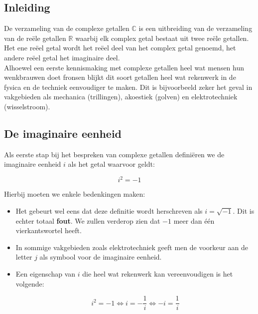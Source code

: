 
\subsection*{Inleiding}

De verzameling van de complexe getallen $\mathbb{C}$ is een uitbreiding van de verzameling van de re\"{e}le getallen $\mathbb{R}$ waarbij elk complex getal bestaat uit twee re\"{e}le getallen. Het ene re\"{e}el getal wordt het re\"{e}el deel van het complex getal genoemd, het andere re\"{e}el getal het imaginaire deel.\\ 
Alhoewel een eerste kennismaking met complexe getallen heel wat mensen hun wenkbrauwen doet fronsen blijkt dit soort getallen heel wat rekenwerk in de fysica en de techniek eenvoudiger te maken. Dit is bijvoorbeeld zeker het geval in vakgebieden als mechanica (trillingen), akoestiek (golven) en elektrotechniek (wisselstroom).\\

\subsection{De imaginaire eenheid}

Als eerste stap bij het bespreken van complexe getallen defini\"{e}ren we de imaginaire eenheid $i$ als het getal waarvoor geldt:

\begin{framed}
\[
i^2 =-1 
\]
\end{framed}

Hierbij moeten we enkele bedenkingen maken:\\
\begin{itemize}
\item Het gebeurt wel eens dat deze definitie wordt herschreven als $i=\sqrt{-1}$. Dit is echter totaal {\bf fout}. We zullen verderop zien dat $-1$ meer dan \'{e}\'{e}n vierkantswortel heeft.
\item In sommige vakgebieden zoals elektrotechniek geeft men de voorkeur aan de letter $j$ als symbool voor de imaginaire eenheid.
\item Een eigenschap van $i$ die heel wat rekenwerk kan vereenvoudigen is het volgende:
\begin{framed}
	\[ i^2=-1 \iff  i=-\frac{1}{i} \iff -i=\frac{1}{i} \] 
\end{framed}

\end{itemize}

